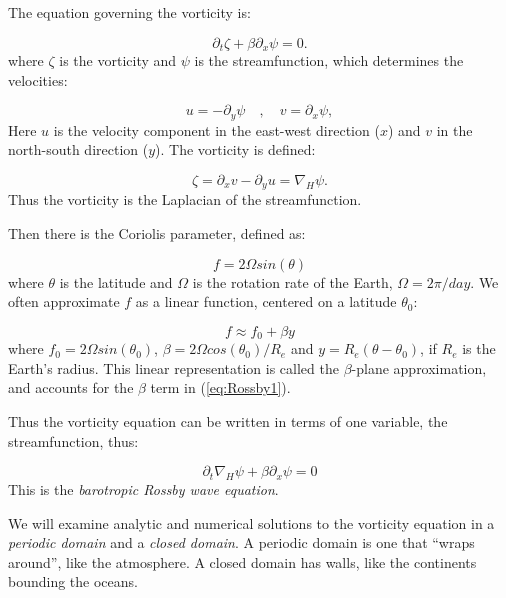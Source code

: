 \documentclass[%
oneside,                 %
final,                   %
10pt]{article}
\begin{document}
The equation governing the vorticity is:

\begin{equation}
  \label{eq:Rossby1}
	\partial_t \zeta  + \beta \partial_x\psi = 0.
 \end{equation}
where $\zeta$ is the vorticity and $\psi$ is the streamfunction, which determines the velocities:

\begin{equation}
	u = -\partial_y \psi \quad,\quad v = \partial_x \psi,
\end{equation}
Here $u$ is the velocity component in the east-west direction ($x$)
and $v$ in the north-south direction ($y$). The vorticity is
defined:

\begin{equation}
\label{eq:Rossby2}
	\zeta = \partial_x v -\partial_y u = \nabla_H \psi.
\end{equation}
Thus the vorticity is the Laplacian of the streamfunction. 

Then there is the Coriolis parameter, defined as:

\begin{equation}
f = 2 \Omega sin(\theta)
\end{equation}
where $\theta$ is the latitude and $\Omega$ is the rotation
rate of the Earth, $\Omega=2 \pi/day$. We often approximate
$f$ as a linear function, centered on a latitude $\theta_0$:

\begin{equation}
f \approx f_0 + \beta y
\end{equation}
where $f_0 = 2 \Omega sin(\theta_0)$, $\beta = 2 \Omega
cos(\theta_0)/R_e$ and $y = R_e (\theta - \theta_0)$, if $R_e$ is the
Earth's radius. This linear representation is called the
$\beta$-plane approximation, and accounts for the $\beta$ term in
(\ref{eq:Rossby1}).

Thus the vorticity equation can be written in terms of one variable,
the streamfunction, thus:

\begin{equation}
  \label{eq:Rossby}
\partial_t \nabla_H \psi  + \beta \partial_x\psi = 0
 \end{equation}
This is the \emph{barotropic Rossby wave equation}.


We will examine analytic and numerical solutions to the vorticity
equation in a \emph{periodic domain} and a \emph{closed domain}. A
periodic domain is one that ``wraps around'', like the atmosphere. A
closed domain has walls, like the continents bounding the oceans.
\end{document}
